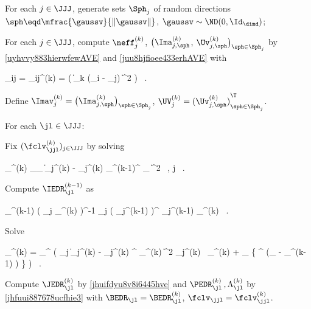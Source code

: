 \begin{mylist}


\item
For each \( j \in \JJJ \),
generate sets \( \Sph_{j} \) of random directions  
\( \sph \eqd \mfrac{\gaussv}{\| \gaussv \|} \), 
\( \gaussv \sim \ND(0,\Id_{\dimd}) \);

\item 
For each \( j \in \JJJ \), compute 
\( \neff_{j}^{(k)} \), \( \bigl( \Ima_{j,\sph}^{(k)} \), \( \Uv_{j,\sph}^{(k)} \bigr)_{\sph \in \Sph_{j}} \)
by \eqref{uyhvvy883hierwfewAVE} and \eqref{juu8hjfioee433erhAVE} with
\begin{EQA}[c]
	\weight_{ij} 
	= 
	\weight_{ij}^{(k)}
	= 
	\Kern\bigl( \| \TEDR_{k} (\Xv_{i} - \xv_{j}) \|^{2} \bigr) 
	\, .
\end{EQA}
Define 
\( \Imav_{j}^{(k)} = \bigl( \Ima_{j,\sph}^{(k)} \bigr)_{\sph \in \Sph_{j}} \),
\( \UV_{j}^{(k)} = {(\Uv_{j,\sph}^{(k)})}_{\sph \in \Sph_{j}}^{\T} \).

\item
For each \( \jl \in \JJJ \):
\begin{mylist}
	\item
	Fix \( (\fclv_{\jjl}^{(k)})_{j \in \JJJ} \) by solving 
\begin{EQA}[c]
	\fclv_{\jjl}^{(k)}
	\eqdef
	\arginf_{\fclv_{\jjl}}
	\bigl\| \Imav_{j}^{(k)} - \UV_{j}^{(k)} {\PEDR_{\jl}^{(k-1)}}^{\T} \fclv_{\jjl} \bigr\|^{2}
	\, ,
	\quad
	j \in \JJJ
	\, .
	\qquad
\label{kiiilfduy543rbgckr7r}
\end{EQA}
%
	\item
	Compute \( \IEDR_{\jl}^{(k-1)} \) as
\begin{EQA}[c]
	\IEDR_{\jl}^{(k-1)}
	\eqdef
	\biggl( \sum_{j \in \JJJ} \weightM_{\jjl}^{(k)} \biggr)^{-1} 
	\sum_{j \in \JJJ} \bigl( \PEDR_{j}^{(k-1)} \bigr)^{\T} \PEDR_{j}^{(k-1)} \; \weightM_{\jjl}^{(k)}
	\, .
\label{jfu88uuujpvue2rchuu}
\end{EQA}

%
	\item
	Solve
\begin{EQA}[c]
	\BEDR_{\jl}^{(k)}
	=
	\arginf_{\BEDR \in \R^{\dimm \times \dimd}} \biggl( \sum_{j \in \JJJ}
		\bigl\| \Imav_{j}^{(k)} - \UV_{j}^{(k)} \BEDR^{\T} \fclv_{\jjl}^{(k)} \bigr\|^{2} \neff_{j}^{(k)} \, 
		\weightM_{\jjl}^{(k)}
		+ \lambda_{\subM} \tr\bigl\{ \BEDR^{\T} \BEDR (\Id_{\dimd}  - \IEDR_{\jl}^{(k-1)} ) \bigr\}
	\biggr)
	\, .
	\qquad
\end{EQA}
%
	\item
	Compute \( \JEDR_{\jl}^{(k)} \) by \eqref{jhuifdyu8v8i6445hve} and 
	\( \PEDR_{\jl}^{(k)} \, , \Lambda_{\jl}^{(k)} \) by \eqref{jhfuui887678ucfhie3}
	with \( \BEDR_{\jl} = \BEDR_{\jl}^{(k)} \), \( \fclv_{\jjl} = \fclv_{\jjl}^{(k)} \).


\end{mylist}
\end{mylist}
